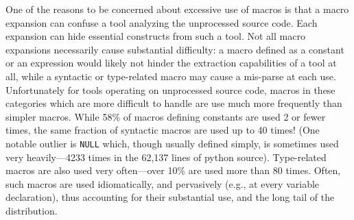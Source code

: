 \documentclass[10pt]{article}
\newcommand{\pkg}[1]{\textsf{#1}}
\begin{document}
One of the reasons to be concerned about excessive use of macros is that
a macro expansion can confuse a tool analyzing the unprocessed source
code.  Each expansion can hide essential constructs from such a tool.
Not all macro expansions necessarily cause substantial difficulty: a
macro defined as a constant or an expression would likely not hinder the
extraction capabilities of a tool at all, while a syntactic or
type-related macro may cause a mis-parse at each use.  Unfortunately for
tools operating on unprocessed source code, macros in these categories which are more
difficult to handle are use much more frequently
than simpler macros.  While 58\% of macros defining constants are
used 2 or fewer times, the same fraction of syntactic macros are used up
to 40 times!  (One notable outlier is \texttt{NULL} which, though usually
defined simply, is sometimes used very heavily---4233 times in the
62,137 lines of \pkg{python} source). Type-related macros are also used
very often---over 10\% are used more than 80 times.  Often, such macros
are used idiomatically, and pervasively (e.g., at every variable
declaration), thus accounting for their substantial use, and the long
tail of the distribution.




\end{document}
